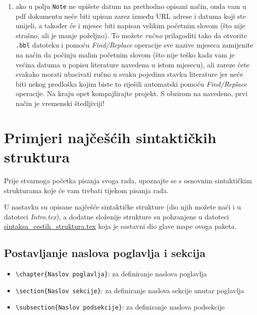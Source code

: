 \begin{itemize}
\begin{enumerate}[label=\textbf{\roman*)}]
		\item ako u polju \verb|Note| ne upišete datum na prethodno opisani način, onda vam u pdf dokumentu neće biti upisan zarez između URL adrese i datuma koji ste unijeli, a također će i mjesec biti napisan velikim početnim slovom (što nije strašno, ali je manje poželjno). To možete \emph{ručno} prilagoditi tako da otvorite \verb|.bbl| datoteku i pomoću \emph{Find/Replace} operacije sve nazive mjeseca zamijenite na način da počinju malim početnim slovom (što nije teško kada vam je većina datuma u popisu literature navedena u istom mjesecu), ali zareze ćete svakako morati ubacivati ručno u svaku pojedinu stavku literature jer neće biti nekog predloška kojim biste to riješili automatski pomoću \emph{Find/Replace} operacije. Na kraju opet kompajlirajte projekt. S obzirom na navedeno, prvi način je vremenski štedljiviji!
	\end{enumerate}
\end{itemize}



\chapter{Primjeri najčešćih sintaktičkih struktura}
Prije stvarnoga početka pisanja svoga rada, upoznajte se s osnovnim sintaktičkim strukturama koje će vam trebati tijekom pisanja rada.

U nastavku su opisane najčešće sintaktičke strukture (dio njih možete naći i u datoteci \emph{Intro.tex}), a dodatne složenije strukture su pohranjene u datoteci \href{run:sintaksa_cestih_struktura.tex}{{\color{blue}sintaksa\_cestih\_struktura.tex}} koja je sastavni dio glave mape ovoga paketa. 

\section{Postavljanje naslova poglavlja i sekcija}
\begin{itemize}
	\item \verb|\chapter{Naslov poglavlja}|: za definiranje naslova poglavlja
	\item \verb|\section{Naslov sekcije}|: za definiranje naslova sekcije unutar poglavlja
	\item \verb|\subsection{Naslov podsekcije}|: za definiranje naslova podsekcije
\end{itemize}


